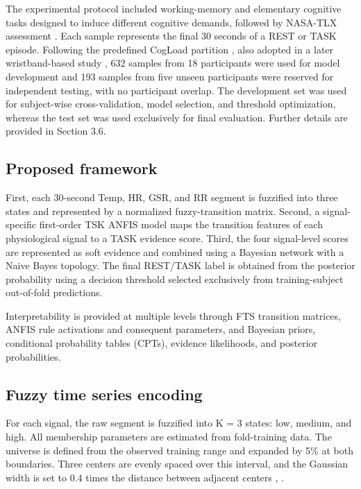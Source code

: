 \documentclass[runningheads]{llncs}
\begin{document}
The experimental protocol included working-memory and elementary cognitive tasks designed to induce different cognitive demands, followed by NASA-TLX assessment \cite{ref4}. Each sample represents the final 30 seconds of a REST or TASK episode. Following the predefined CogLoad partition \cite{ref3}, also adopted in a later wristband-based study \cite{ref17}, 632 samples from 18 participants were used for model development and 193 samples from five unseen participants were reserved for independent testing, with no participant overlap. The development set was used for subject-wise cross-validation, model selection, and threshold optimization, whereas the test set was used exclusively for final evaluation. Further details are provided in Section 3.6.

\subsection{Proposed framework}

First, each 30-second Temp, HR, GSR, and RR segment is fuzzified into three states and represented by a normalized fuzzy-transition matrix. Second, a signal-specific first-order TSK ANFIS model maps the transition features of each physiological signal to a TASK evidence score. Third, the four signal-level scores are represented as soft evidence and combined using a Bayesian network with a Naive Bayes topology. The final REST/TASK label is obtained from the posterior probability using a decision threshold selected exclusively from training-subject out-of-fold predictions.

Interpretability is provided at multiple levels through FTS transition matrices, ANFIS rule activations and consequent parameters, and Bayesian priors, conditional probability tables (CPTs), evidence likelihoods, and posterior probabilities.

\subsection{Fuzzy time series encoding}

For each signal, the raw segment is fuzzified into K = 3 states: low, medium, and high. All membership parameters are estimated from fold-training data. The universe is defined from the observed training range and expanded by 5\% at both boundaries. Three centers are evenly spaced over this interval, and the Gaussian width is set to 0.4 times the distance between adjacent centers \cite{ref5}, \cite{ref15}.
\end{document}
